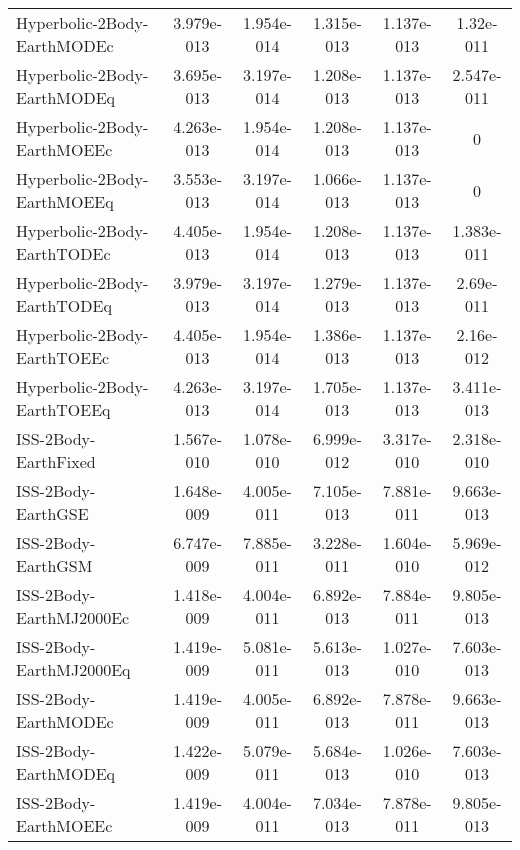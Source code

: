 \begin{table}[htbp!]
\begin{tabular}{lccccc}
         Hyperbolic-2Body-EarthMODEc & 3.979e-013 & 1.954e-014 & 1.315e-013 & 1.137e-013 & 1.32e-011 \\
         Hyperbolic-2Body-EarthMODEq & 3.695e-013 & 3.197e-014 & 1.208e-013 & 1.137e-013 & 2.547e-011 \\
         Hyperbolic-2Body-EarthMOEEc & 4.263e-013 & 1.954e-014 & 1.208e-013 & 1.137e-013 & 0 \\
         Hyperbolic-2Body-EarthMOEEq & 3.553e-013 & 3.197e-014 & 1.066e-013 & 1.137e-013 & 0 \\
         Hyperbolic-2Body-EarthTODEc & 4.405e-013 & 1.954e-014 & 1.208e-013 & 1.137e-013 & 1.383e-011 \\
         Hyperbolic-2Body-EarthTODEq & 3.979e-013 & 3.197e-014 & 1.279e-013 & 1.137e-013 & 2.69e-011 \\
         Hyperbolic-2Body-EarthTOEEc & 4.405e-013 & 1.954e-014 & 1.386e-013 & 1.137e-013 & 2.16e-012 \\
         Hyperbolic-2Body-EarthTOEEq & 4.263e-013 & 3.197e-014 & 1.705e-013 & 1.137e-013 & 3.411e-013 \\
         ISS-2Body-EarthFixed & 1.567e-010 & 1.078e-010 & 6.999e-012 & 3.317e-010 & 2.318e-010 \\
         ISS-2Body-EarthGSE & 1.648e-009 & 4.005e-011 & 7.105e-013 & 7.881e-011 & 9.663e-013 \\
         ISS-2Body-EarthGSM & 6.747e-009 & 7.885e-011 & 3.228e-011 & 1.604e-010 & 5.969e-012 \\
         ISS-2Body-EarthMJ2000Ec & 1.418e-009 & 4.004e-011 & 6.892e-013 & 7.884e-011 & 9.805e-013 \\
         ISS-2Body-EarthMJ2000Eq & 1.419e-009 & 5.081e-011 & 5.613e-013 & 1.027e-010 & 7.603e-013 \\
         ISS-2Body-EarthMODEc & 1.419e-009 & 4.005e-011 & 6.892e-013 & 7.878e-011 & 9.663e-013 \\
         ISS-2Body-EarthMODEq & 1.422e-009 & 5.079e-011 & 5.684e-013 & 1.026e-010 & 7.603e-013 \\
         ISS-2Body-EarthMOEEc & 1.419e-009 & 4.004e-011 & 7.034e-013 & 7.878e-011 & 9.805e-013 \\

\end{tabular}
\end{table}
